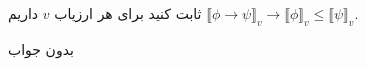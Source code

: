 ثابت کنید برای هر ارزیاب $v$ داریم
$\llbracket \phi\to\psi\rrbracket_v\to\llbracket\phi\rrbracket_v\leq\llbracket\psi\rrbracket_v$.
\begin{ans}
بدون جواب
\end{ans}
